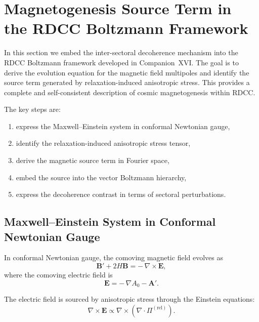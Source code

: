 \documentclass[11pt,a4paper]{article}
\begin{document}
\section{Magnetogenesis Source Term in the RDCC Boltzmann Framework}

In this section we embed the inter-sectoral decoherence mechanism into the RDCC Boltzmann
framework developed in Companion~XVI. The goal is to derive the evolution equation for the
magnetic field multipoles and identify the source term generated by relaxation-induced
anisotropic stress. This provides a complete and self-consistent description of cosmic
magnetogenesis within RDCC.

The key steps are:
\begin{enumerate}
\item express the Maxwell–Einstein system in conformal Newtonian gauge,
\item identify the relaxation-induced anisotropic stress tensor,
\item derive the magnetic source term in Fourier space,
\item embed the source into the vector Boltzmann hierarchy,
\item express the decoherence contrast in terms of sectoral perturbations.
\end{enumerate}

\subsection{Maxwell–Einstein System in Conformal Newtonian Gauge}

In conformal Newtonian gauge, the comoving magnetic field evolves as
\begin{equation}
\mathbf{B}' + 2H\mathbf{B}
=
-\,\nabla \times \mathbf{E},
\label{eq:Bevol}
\end{equation}
where the comoving electric field is
\begin{equation}
\mathbf{E}
=
-\,\nabla A_{0}
-
\mathbf{A}'.
\end{equation}

The electric field is sourced by anisotropic stress through the Einstein equations:
\begin{equation}
\nabla \times \mathbf{E}
\propto
\nabla \times
\left(
\nabla \cdot \Pi^{(\mathrm{rel})}
\right).
\end{equation}
\end{document}
